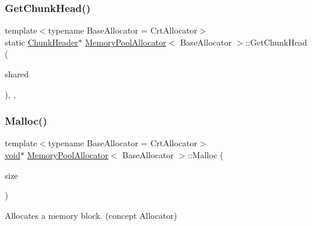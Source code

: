 \subsubsection{\texorpdfstring{Get\+Chunk\+Head()}{GetChunkHead()}}
{\footnotesize\ttfamily template$<$typename Base\+Allocator = Crt\+Allocator$>$ \\
static \hyperlink{structMemoryPoolAllocator_1_1ChunkHeader}{Chunk\+Header}$\ast$ \hyperlink{classMemoryPoolAllocator}{Memory\+Pool\+Allocator}$<$ Base\+Allocator $>$\+::Get\+Chunk\+Head (\begin{DoxyParamCaption}\item[{\hyperlink{structMemoryPoolAllocator_1_1SharedData}{Shared\+Data} $\ast$}]{shared }\end{DoxyParamCaption})\hspace{0.3cm}{\ttfamily [inline]}, {\ttfamily [static]}, {\ttfamily [private]}}

\mbox{\label{classMemoryPoolAllocator_a02f6832910453446cb77bf919ba49e99}} 
\subsubsection{\texorpdfstring{Malloc()}{Malloc()}}
{\footnotesize\ttfamily template$<$typename Base\+Allocator = Crt\+Allocator$>$ \\
\hyperlink{imgui__impl__opengl3__loader_8h_ac668e7cffd9e2e9cfee428b9b2f34fa7}{void}$\ast$ \hyperlink{classMemoryPoolAllocator}{Memory\+Pool\+Allocator}$<$ Base\+Allocator $>$\+::Malloc (\begin{DoxyParamCaption}\item[{size\+\_\+t}]{size }\end{DoxyParamCaption})\hspace{0.3cm}{\ttfamily [inline]}}



Allocates a memory block. (concept Allocator) 

\mbox{\label{classMemoryPoolAllocator_ab81d11c88aef06b905cece2e5a4e7b4d}} 
